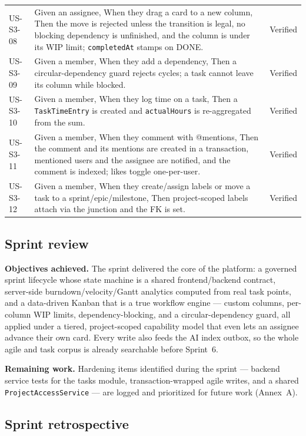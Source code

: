 \begin{longtable}{@{}p{1.8cm}p{8.3cm}p{3.8cm}@{}}
US-S3-08 & Given an assignee, When they drag a card to a new column, Then the move is rejected unless the transition is legal, no blocking dependency is unfinished, and the column is under its WIP limit; \texttt{completedAt} stamps on DONE. & \pass{} Verified \\
\rowcolor{rowalt}
US-S3-09 & Given a member, When they add a dependency, Then a circular-dependency guard rejects cycles; a task cannot leave its column while blocked. & \pass{} Verified \\
US-S3-10 & Given a member, When they log time on a task, Then a \texttt{TaskTimeEntry} is created and \texttt{actualHours} is re-aggregated from the sum. & \pass{} Verified \\
\rowcolor{rowalt}
US-S3-11 & Given a member, When they comment with @mentions, Then the comment and its mentions are created in a transaction, mentioned users and the assignee are notified, and the comment is indexed; likes toggle one-per-user. & \pass{} Verified \\
US-S3-12 & Given a member, When they create/assign labels or move a task to a sprint/epic/milestone, Then project-scoped labels attach via the junction and the FK is set. & \pass{} Verified \\
\end{longtable}

\subsection{Sprint review}

\textbf{Objectives achieved.} The sprint delivered the core of the platform: a governed
sprint lifecycle whose state machine is a shared frontend/backend contract, server-side
burndown/velocity/Gantt analytics computed from real task points, and a data-driven Kanban that
is a true workflow engine --- custom columns, per-column WIP limits, dependency-blocking, and
a circular-dependency guard, all applied under a tiered, project-scoped capability model that
even lets an assignee advance their own card. Every write also feeds the AI index outbox, so the
whole agile and task corpus is already searchable before Sprint~6.

\textbf{Remaining work.} Hardening items identified during the sprint --- backend service tests
for the tasks module, transaction-wrapped agile writes, and a shared
\texttt{ProjectAccessService} --- are logged and prioritized for future work (Annex~A).

\subsection{Sprint retrospective}

